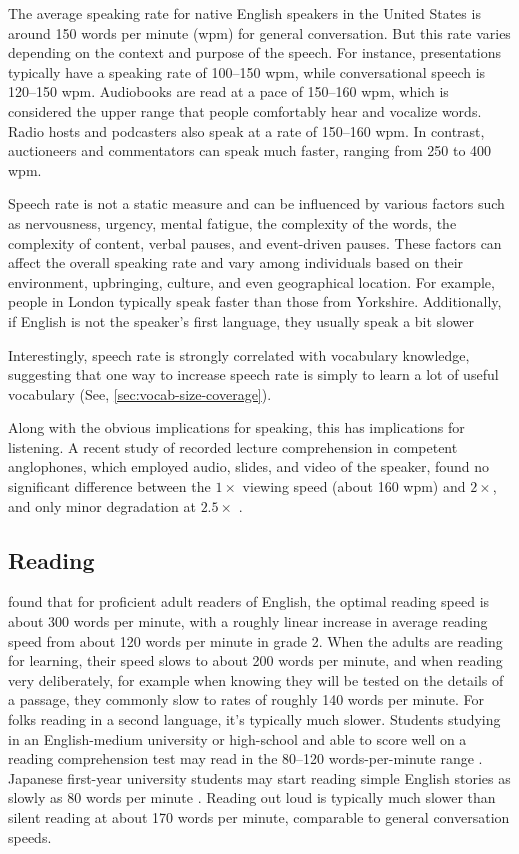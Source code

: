 The average speaking rate for native English speakers in the United States is around 150 words per minute (wpm) for general conversation. But this rate varies depending on the context and purpose of the speech. For instance, presentations typically have a speaking rate of 100--150 wpm, while conversational speech is 120--150 wpm. Audiobooks are read at a pace of 150--160 wpm, which is considered the upper range that people comfortably hear and vocalize words. Radio hosts and podcasters also speak at a rate of 150--160 wpm. In contrast, auctioneers and commentators can speak much faster, ranging from 250 to 400 wpm.

Speech rate is not a static measure and can be influenced by various factors such as nervousness, urgency, mental fatigue, the complexity of the words, the complexity of content, verbal pauses, and event-driven pauses. These factors can affect the overall speaking rate and vary among individuals based on their environment, upbringing, culture, and even geographical location. For example, people in London typically speak faster than those from Yorkshire. Additionally, if English is not the speaker's first language, they usually speak a bit slower

Interestingly, speech rate is strongly correlated with vocabulary knowledge, suggesting that one way to increase speech rate is simply to learn a lot of useful vocabulary (See, \ref{sec:vocab-size-coverage}).

Along with the obvious implications for speaking, this has implications for listening. A recent study of recorded lecture comprehension in competent anglophones, which employed audio, slides, and video of the speaker, found no significant difference between the $1\times$ viewing speed (about 160 wpm) and $2\times$, and only minor degradation at $2.5\times$ \citep{Murphy2021}.

\subsection{Reading}

\citet{Carver1992} found that for proficient adult readers of English, the optimal reading speed is about 300 words per minute, with a roughly linear increase in average reading speed from about 120 words per minute in grade 2. When the adults are reading for learning, their speed slows to about 200 words per minute, and when reading very deliberately, for example when knowing they will be tested on the details of a passage, they commonly slow to rates of roughly 140 words per minute. For folks reading in a second language, it's typically much slower. Students studying in an English-medium university or high-school and able to score well on a reading comprehension test may read in the 80--120 words-per-minute range \citep[292]{Grabe2009}. Japanese first-year university students may start reading simple English stories as slowly as 80 words per minute \citep{McLean2017}. Reading out loud is typically much slower than silent reading at about 170 words per minute, comparable to general conversation speeds.

